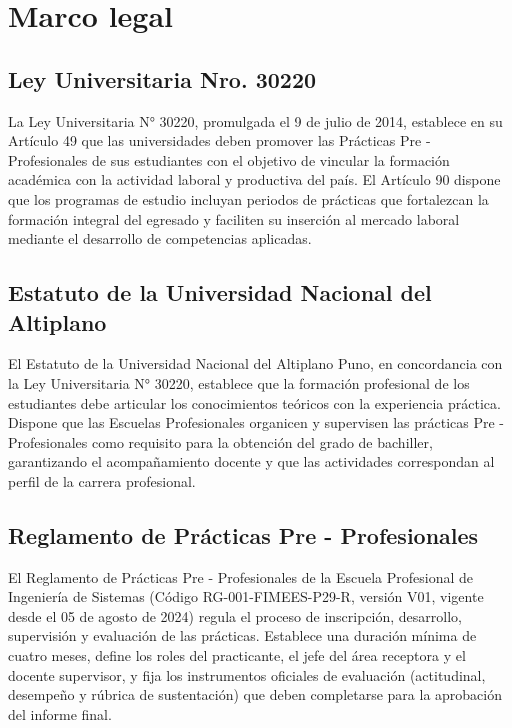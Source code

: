\newpage
\section{Marco legal}
\subsection{Ley Universitaria Nro. 30220}
La Ley Universitaria N° 30220, promulgada el 9 de julio de 2014, establece en su Artículo 49 que las universidades deben promover las Prácticas Pre - Profesionales de sus estudiantes con el objetivo de vincular la formación académica con la actividad laboral y productiva del país. El Artículo 90 dispone que los programas de estudio incluyan periodos de prácticas que fortalezcan la formación integral del egresado y faciliten su inserción al mercado laboral mediante el desarrollo de competencias aplicadas.

\subsection{Estatuto de la Universidad Nacional del Altiplano}
El Estatuto de la Universidad Nacional del Altiplano Puno, en concordancia con la Ley Universitaria N° 30220, establece que la formación profesional de los estudiantes debe articular los conocimientos teóricos con la experiencia práctica. Dispone que las Escuelas Profesionales organicen y supervisen las prácticas Pre - Profesionales como requisito para la obtención del grado de bachiller, garantizando el acompañamiento docente y que las actividades correspondan al perfil de la carrera profesional.

\subsection{Reglamento de Prácticas Pre - Profesionales}
El Reglamento de Prácticas Pre - Profesionales de la Escuela Profesional de Ingeniería de Sistemas (Código RG-001-FIMEES-P29-R, versión V01, vigente desde el 05 de agosto de 2024) regula el proceso de inscripción, desarrollo, supervisión y evaluación de las prácticas. Establece una duración mínima de cuatro meses, define los roles del practicante, el jefe del área receptora y el docente supervisor, y fija los instrumentos oficiales de evaluación (actitudinal, desempeño y rúbrica de sustentación) que deben completarse para la aprobación del informe final.
